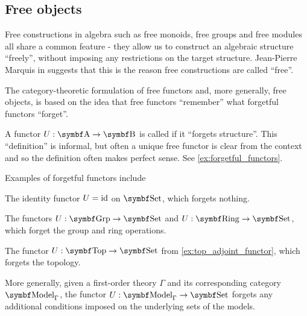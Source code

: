 \subsection{Free objects}\label{subsec:free_objects}

\begin{remark}\label{remark:free_construction_etymology}
  Free constructions in algebra such as free monoids, free groups and free modules  all share a common feature - they allow us to construct an algebraic structure \enquote{freely}, without imposing any restrictions on the target structure. Jean-Pierre Marquis in \cite{StanfordPlato:category_theory} suggests that this is the reason free constructions are called \enquote{free}.

  The category-theoretic formulation of free functors and, more generally, free objects, is based on the idea that free functors \enquote{remember} what forgetful functors \enquote{forget}.
\end{remark}

\begin{definition}\label{def:forgetful_functor}\cite[examples 1.2.3]{Leinster2014}
  A functor \( U: \Cat{A} \to \Cat{B} \) is called  if it \enquote{forgets structure}. This \enquote{definition} is informal, but often a unique free functor is clear from the context and so the definition often makes perfect sense. See \cref{ex:forgetful_functors}.
\end{definition}

\begin{example}\label{ex:forgetful_functors}
  Examples of forgetful functors include

  \begin{defenum}
    \item The identity functor \( U = \operatorname{id} \) on \( \Cat{Set} \), which forgets nothing.
    \item The functors \( U: \Cat{Grp} \to \Cat{Set} \) and \( U: \Cat{Ring} \to \Cat{Set} \), which forget the group and ring operations.
    \item The functor \( U: \Cat{Top} \to \Cat{Set} \) from \cref{ex:top_adjoint_functor}, which forgets the topology.
    \item More generally, given a first-order theory \( \Gamma \) and its corresponding category \( \Cat{Model}_\Gamma \), the functor \( U: \Cat{Model}_\Gamma \to \Cat{Set} \) forgets any additional conditions imposed on the underlying sets of the models.
  \end{defenum}
\end{example}

